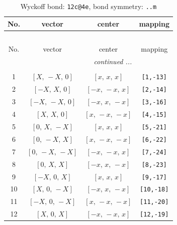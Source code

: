 \documentclass[fleqn,8pt]{jsarticle}
\begin{document}
\begin{longtable}{cccc}
\caption{Wyckoff bond: {\tt 12c@4e}, bond symmetry: {\tt ..m}}
 \\
 \hline \hline
No. & vector & center & mapping \\ \hline \endfirsthead

\multicolumn{3}{l}{\tablename\ \thetable{}} \\
 \hline \hline
No. & vector & center & mapping \\ \hline \endhead

 \hline \hline
\multicolumn{3}{r}{\footnotesize\it continued ...} \\ \endfoot

 \hline \hline
\multicolumn{3}{r}{} \\ \endlastfoot

1 & $\left[ X,\, - X,\, 0 \right]$ & $\left[ x,\, x,\, x \right]$ & {\tt [1,-13]} \\ \hline
2 & $\left[ - X,\, X,\, 0 \right]$ & $\left[ - x,\, - x,\, x \right]$ & {\tt [2,-14]} \\ \hline
3 & $\left[ - X,\, - X,\, 0 \right]$ & $\left[ - x,\, x,\, - x \right]$ & {\tt [3,-16]} \\ \hline
4 & $\left[ X,\, X,\, 0 \right]$ & $\left[ x,\, - x,\, - x \right]$ & {\tt [4,-15]} \\ \hline
5 & $\left[ 0,\, X,\, - X \right]$ & $\left[ x,\, x,\, x \right]$ & {\tt [5,-21]} \\ \hline
6 & $\left[ 0,\, - X,\, X \right]$ & $\left[ x,\, - x,\, - x \right]$ & {\tt [6,-22]} \\ \hline
7 & $\left[ 0,\, - X,\, - X \right]$ & $\left[ - x,\, - x,\, x \right]$ & {\tt [7,-24]} \\ \hline
8 & $\left[ 0,\, X,\, X \right]$ & $\left[ - x,\, x,\, - x \right]$ & {\tt [8,-23]} \\ \hline
9 & $\left[ - X,\, 0,\, X \right]$ & $\left[ x,\, x,\, x \right]$ & {\tt [9,-17]} \\ \hline
10 & $\left[ X,\, 0,\, - X \right]$ & $\left[ - x,\, x,\, - x \right]$ & {\tt [10,-18]} \\ \hline
11 & $\left[ - X,\, 0,\, - X \right]$ & $\left[ x,\, - x,\, - x \right]$ & {\tt [11,-20]} \\ \hline
12 & $\left[ X,\, 0,\, X \right]$ & $\left[ - x,\, - x,\, x \right]$ & {\tt [12,-19]} \\
\end{longtable}
\renewcommand{\arraystretch}{1.2}
\end{document}
